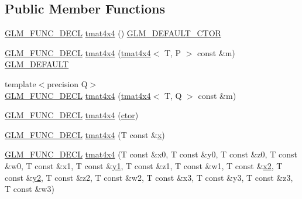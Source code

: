 \subsection*{Public Member Functions}
\begin{DoxyCompactItemize}
\item 
\mbox{\hyperlink{setup_8hpp_ab2d052de21a70539923e9bcbf6e83a51}{G\+L\+M\+\_\+\+F\+U\+N\+C\+\_\+\+D\+E\+CL}} \mbox{\hyperlink{structglm_1_1tmat4x4_a498603057d9ae375f68da4d8db153c13}{tmat4x4}} () \mbox{\hyperlink{setup_8hpp_afb97a4e995bc004c0cbbfa22125b80ba}{G\+L\+M\+\_\+\+D\+E\+F\+A\+U\+L\+T\+\_\+\+C\+T\+OR}}
\item 
\mbox{\hyperlink{setup_8hpp_ab2d052de21a70539923e9bcbf6e83a51}{G\+L\+M\+\_\+\+F\+U\+N\+C\+\_\+\+D\+E\+CL}} \mbox{\hyperlink{structglm_1_1tmat4x4_ae62c8e2f96d55faadb111a8754fc23c8}{tmat4x4}} (\mbox{\hyperlink{structglm_1_1tmat4x4}{tmat4x4}}$<$ T, P $>$ const \&m) \mbox{\hyperlink{setup_8hpp_aefce7051c376a64ba89fa93a9f63bc2c}{G\+L\+M\+\_\+\+D\+E\+F\+A\+U\+LT}}
\item 
{\footnotesize template$<$precision Q$>$ }\\\mbox{\hyperlink{setup_8hpp_ab2d052de21a70539923e9bcbf6e83a51}{G\+L\+M\+\_\+\+F\+U\+N\+C\+\_\+\+D\+E\+CL}} \mbox{\hyperlink{structglm_1_1tmat4x4_a17b8d6a39ce1d3568f8164f66217ae07}{tmat4x4}} (\mbox{\hyperlink{structglm_1_1tmat4x4}{tmat4x4}}$<$ T, Q $>$ const \&m)
\item 
\mbox{\hyperlink{setup_8hpp_ab2d052de21a70539923e9bcbf6e83a51}{G\+L\+M\+\_\+\+F\+U\+N\+C\+\_\+\+D\+E\+CL}} \mbox{\hyperlink{structglm_1_1tmat4x4_a657bf854bdbd47d50e512a263804f394}{tmat4x4}} (\mbox{\hyperlink{namespaceglm_a807df837905ec286f806a536af03b57f}{ctor}})
\item 
\mbox{\hyperlink{setup_8hpp_ab2d052de21a70539923e9bcbf6e83a51}{G\+L\+M\+\_\+\+F\+U\+N\+C\+\_\+\+D\+E\+CL}} \mbox{\hyperlink{structglm_1_1tmat4x4_a298fc842de48d9243b3913dd1bdcfeb0}{tmat4x4}} (T const \&\mbox{\hyperlink{glad_8h_a92d0386e5c19fb81ea88c9f99644ab1d}{x}})
\item 
\mbox{\hyperlink{setup_8hpp_ab2d052de21a70539923e9bcbf6e83a51}{G\+L\+M\+\_\+\+F\+U\+N\+C\+\_\+\+D\+E\+CL}} \mbox{\hyperlink{structglm_1_1tmat4x4_a8a004f9878532de00a3cb1aa22a4f154}{tmat4x4}} (T const \&x0, T const \&y0, T const \&z0, T const \&w0, T const \&x1, T const \&\mbox{\hyperlink{glad_8h_a48340161068d267815ac3131e9d03def}{y1}}, T const \&z1, T const \&w1, T const \&\mbox{\hyperlink{glad_8h_ad2cea6eadb01f017f0d57e7edf0ce988}{x2}}, T const \&\mbox{\hyperlink{glad_8h_af7158b5d27f7a6aa4ab9973fcc3a5c20}{y2}}, T const \&z2, T const \&w2, T const \&x3, T const \&y3, T const \&z3, T const \&w3)

\end{DoxyCompactItemize}
